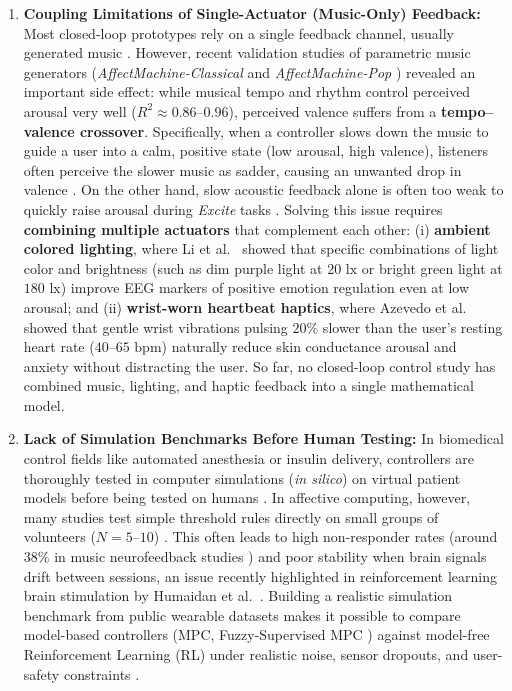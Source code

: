 \documentclass[preprint,12pt]{elsarticle}
\begin{document}
\begin{enumerate}
    \item \textbf{Coupling Limitations of Single-Actuator (Music-Only) Feedback:} Most closed-loop prototypes rely on a single feedback channel, usually generated music \cite{sayal2025music,daly2016affective,ehrlich2019closed}. However, recent validation studies of parametric music generators (\emph{Affect\-Machine-Classical} \cite{agres2023affectmachine} and \emph{Affect\-Machine-Pop} \cite{agres2025affectmachine}) revealed an important side effect: while musical tempo and rhythm control perceived arousal very well ($R^2 \approx 0.86\text{--}0.96$), perceived valence suffers from a \textbf{tempo--valence crossover}. Specifically, when a controller slows down the music to guide a user into a calm, positive state (low arousal, high valence), listeners often perceive the slower music as sadder, causing an unwanted drop in valence \cite{ehrlich2019closed,agres2023affectmachine,agres2025affectmachine}. On the other hand, slow acoustic feedback alone is often too weak to quickly raise arousal during \emph{Excite} tasks \cite{daly2016affective}. Solving this issue requires \textbf{combining multiple actuators} that complement each other: (i) \textbf{ambient colored lighting}, where Li et al.~\cite{li2025designing} showed that specific combinations of light color and brightness (such as dim purple light at $20\text{ lx}$ or bright green light at $180\text{ lx}$) improve EEG markers of positive emotion regulation even at low arousal; and (ii) \textbf{wrist-worn heartbeat haptics}, where Azevedo et al.~\cite{azevedo2017calming} showed that gentle wrist vibrations pulsing $20\%$ slower than the user's resting heart rate ($40\text{--}65\text{ bpm}$) naturally reduce skin conductance arousal and anxiety without distracting the user. So far, no closed-loop control study has combined music, lighting, and haptic feedback into a single mathematical model.

    \item \textbf{Lack of Simulation Benchmarks Before Human Testing:} In biomedical control fields like automated anesthesia or insulin delivery, controllers are thoroughly tested in computer simulations (\emph{in silico}) on virtual patient models before being tested on humans \cite{azgomi2022enhancement}. In affective computing, however, many studies test simple threshold rules directly on small groups of volunteers ($N = 5\text{--}10$) \cite{zhang2026closed,sayal2025music,ramirez2015musical,ehrlich2019closed}. This often leads to high non-responder rates (around $38\%$ in music neurofeedback studies \cite{sayal2025music}) and poor stability when brain signals drift between sessions, an issue recently highlighted in reinforcement learning brain stimulation by Humaidan et al.~\cite{humaidan2026first}. Building a realistic simulation benchmark from public wearable datasets makes it possible to compare model-based controllers (MPC, Fuzzy-Supervised MPC \cite{azgomi2022enhancement}) against model-free Reinforcement Learning (RL) \cite{humaidan2026first} under realistic noise, sensor dropouts, and user-safety constraints \cite{steinert2020wired}.
\end{enumerate}
\end{document}
